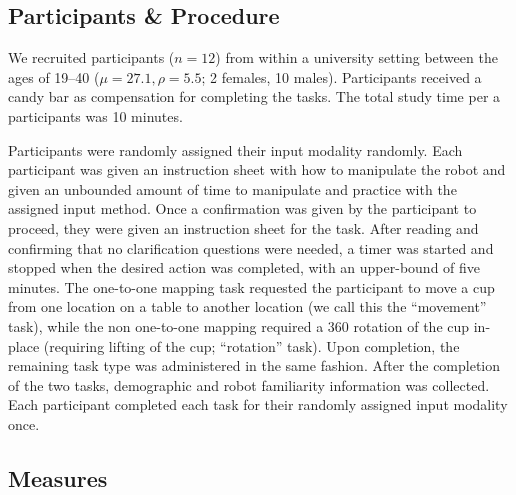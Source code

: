 \documentclass{sigchi}
\begin{document}

\subsection{Participants \& Procedure}

We recruited participants ($n=12$) from within a university setting between the ages of 19--40 ($\mu = 27.1, \rho = 5.5$; 2 females, 10 males). Participants received a candy bar as compensation for completing the tasks. The total study time per a participants was 10 minutes.

Participants were randomly assigned their input modality randomly.  Each participant was given an instruction sheet with how to manipulate the robot and given an unbounded amount of time to manipulate and practice with the assigned input method.  Once a confirmation was given by the participant to proceed, they were given an instruction sheet for the task.  After reading and confirming that no clarification questions were needed, a timer was started and stopped when the desired action was completed, with an upper-bound of five minutes.  The one-to-one mapping task requested the participant to move a cup from one location on a table to another location (we call this the ``movement'' task), while the non one-to-one mapping required a 360 rotation of the cup in-place (requiring lifting of the cup; ``rotation'' task).  Upon completion, the remaining task type was administered in the same fashion.  After the completion of the two tasks, demographic and robot familiarity information was collected. Each participant completed each task for their randomly assigned input modality once. 

\subsection{Measures}
\end{document}
